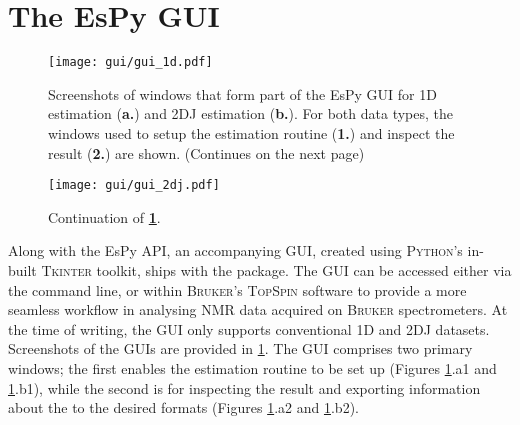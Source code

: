 \section{The \acs{EsPy} \acs{GUI}}
\begin{figure}
    \centering
    \texttt{[image: gui/gui\_1d.pdf]}
    \caption[
        Screenshots of the \acs{EsPy} \acs{GUI} for \ac{1D} and \acs{2DJ} estimation.
    ]{
        Screenshots of windows that form part of the \ac{EsPy} \ac{GUI} for
        \ac{1D} estimation (\textbf{a.}) and \ac{2DJ} estimation (\textbf{b.}).
        For both data types, the windows used to setup the estimation routine
        (\textbf{1.}) and inspect the result (\textbf{2.}) are shown.
        (Continues on the next page)
    }
    \label{fig:gui}
\end{figure}
\begin{figure}%
    \ContinuedFloat
    \centering
    \texttt{[image: gui/gui\_2dj.pdf]}
    \caption*{Continuation of \textbf{\cref{fig:gui}}.}
\end{figure}
Along with the \ac{EsPy} \ac{API}, an accompanying \ac{GUI}, created using
\textsc{Python}'s in-built \textsc{Tkinter} toolkit\cite{tkinter}, ships with
the package. The \ac{GUI} can be accessed either via the command line, or within
\textsc{Bruker}'s \textsc{TopSpin} software to provide a more seamless workflow
in analysing \ac{NMR} data acquired on \textsc{Bruker} spectrometers.
At the time of writing, the \ac{GUI} only supports conventional \ac{1D}
and \ac{2DJ} datasets. Screenshots of the \acp{GUI} are provided in
\cref{fig:gui}.
The \ac{GUI} comprises two primary windows; the first enables the estimation
routine to be set up (Figures \ref{fig:gui}.a1 and \ref{fig:gui}.b1), while the
second is for inspecting the result and exporting information about the to the
desired formats (Figures \ref{fig:gui}.a2 and \ref{fig:gui}.b2).

